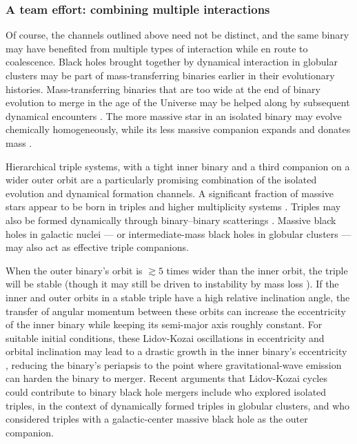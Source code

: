 \documentclass[iop,onecolumn]{revtex4-1}
\begin{document}
\subsubsection{A team effort: combining multiple interactions}

Of course, the channels outlined above need not be distinct, and the same binary may have benefited from multiple types of interaction while en route to coalescence.  Black holes brought together by dynamical interaction in globular clusters may be part of mass-transferring binaries earlier in their evolutionary histories.  Mass-transferring binaries that are too wide at the end of binary evolution to merge in the age of the Universe may be helped along by subsequent dynamical encounters \citep[e.g.,][]{Belczynski:2014VMS}.  The more massive star in an isolated binary may evolve chemically homogeneously, while its less massive companion expands and donates mass \citep{Marchant:2017}.

Hierarchical triple systems, with a tight inner binary and a third companion on a wider outer orbit are a particularly promising combination of the isolated evolution and dynamical formation channels.  A significant fraction of massive stars appear to be born in triples and higher multiplicity systems \citep{DucheneKraus:2013}.  Triples may also be formed dynamically through binary--binary scatterings \citep{MillerHamilton:2002b}.  Massive black holes in galactic nuclei --- or intermediate-mass black holes in globular clusters --- may also act as effective triple companions.   

When the outer binary's orbit is $\gtrsim 5$ times wider than the inner orbit, the triple will be stable (though it may still be driven to instability by mass loss \citep[e.g.,][]{PeretsKratter:2012}).  If the inner and outer orbits in a stable triple have a high relative inclination angle, the transfer of angular momentum between these orbits can increase the eccentricity of the inner binary while keeping its semi-major axis roughly constant. For suitable initial conditions, these Lidov-Kozai oscillations in eccentricity and orbital inclination \citep{Lidov:1962,Kozai:1962} may lead to a drastic growth in the inner binary's eccentricity \citep[for a review, see][]{Naoz:2016}, reducing the binary's periapsis to the point where gravitational-wave emission can harden the binary to merger.  Recent arguments that Lidov-Kozai cycles could contribute to binary black hole mergers include \citet{SilbeeTremaine:2017} who explored isolated triples, \citet{Antonini:2016} in the context of dynamically formed triples in globular clusters, and \citet{Hoang:2018} who considered triples with a galactic-center massive black hole as the outer companion.
\end{document}
